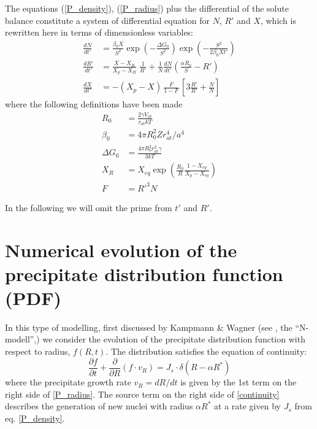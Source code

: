 \documentclass[12pt,a4paper]{article}
\begin{document}
The equations (\ref{P_density}), (\ref{P_radius}) plus the differential of the solute balance constitute a system of differential equation for $N$, $R'$ and $X$, which is rewritten here in terms of dimensionless variables:
\begin{subequations}
\begin{align}
\frac{dN}{dt'} &= 
\frac{\beta_0 X}{S^2} 
\exp\left( -\frac{\Delta G_0}{S^2}\right)  
\exp\left( -\frac{S^2}{2\beta_0 X t'}\right)  \\
\frac{dR'}{dt'} &=  
\frac{X - X_R}{X_p - X_R} 
\; \frac{1}{R'}
+ 
\frac{1}{N}\frac{dN}{dt'}
\left( \frac{\alpha R_0}{S} - R' \right) \\
\frac{dX}{dt'} &= -(X_p - X)\, \frac{F}{1-F} \,
\left[ 3\frac{\dot{R'}}{R'} + \frac{\dot{N}}{N} \right]
\end{align}
\end{subequations}
where the following definitions have been made
\begin{subequations}
\begin{align}
R_0 &= \frac{2\gamma V_{at}}{r_{at}kT} \\ 
\beta_0 &= 4\pi R_0^2 Z r_{at}^4/ a^4 \\
\Delta G_0 &= \frac{4\pi R_0^2 r_{at}^2\gamma }{3kT}  \\
X_R &= X_{eq} \exp 
\left( \frac{R_0}{R} \frac{1-X_{eq}}{X_p - X_{eq}}\right) \\
F &= R'^3 N
\end{align}
\end{subequations}

In the following we will omit the prime from $t'$ and $R'$.

\section{Numerical evolution of the precipitate distribution function (PDF)}

In this type of modelling, first discussed by Kampmann \& Wagner (see \citet{Wagner-2005-HomogeneousSecond-P}, the ``N-modell'',) we consider the evolution of the precipitate distribution function with respect to radius, $f(R,t)$. The distribution satisfies the equation of continuity:
\begin{equation}
\label{continuity}
\frac{\partial f}{\partial t} + \frac{\partial }{\partial R} (f \cdot v_R) = J_s \cdot \delta(R - \alpha R^*)
\end{equation}
where the precipitate growth rate $v_R = dR/dt$ is given by the 1st term on the right side of \eqref{P_radius}. The source term on the right side of \eqref{continuity} describes the generation of new nuclei with radius $\alpha R^*$ at a rate given by $J_s$ from eq. \eqref{P_density}.
\end{document}
